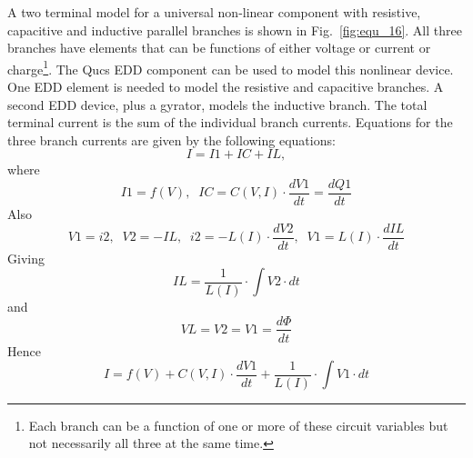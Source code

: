 
A two terminal model for a universal non-linear component with
resistive, capacitive and inductive parallel branches is shown in
Fig.~\ref{fig:equ_16}. All three branches have elements that can be
functions of either voltage or current or charge\footnote{Each branch
can be a function of one or more of these circuit variables but not
necessarily all three at the same time.}.  The Qucs EDD component can
be used to model this nonlinear device. One EDD element is needed to
model the resistive and capacitive branches. A second EDD device, plus
a gyrator, models the inductive branch.  The total terminal current is
the sum of the individual branch currents. Equations for the three
branch currents are given by the following equations:
\begin{equation}
 I=I1+IC+IL,
\end{equation}
where
\begin{equation}
I1 =f(V),\;\; IC=C(V,I)\cdot \dfrac{dV1}{dt} = \dfrac{dQ1}{dt} 
\end{equation} 
Also
\begin{equation}
  V1=i2,\;\;  V2= -IL,\;\;  i2=-L(I) \cdot \dfrac{dV2}{dt},\;\;   V1 = L(I)\cdot \dfrac{dIL}{dt}
\end{equation} 
Giving
\begin{equation}
 IL = \dfrac{1}{L(I)} \cdot \int V2\cdot dt 
\end{equation} 
and
\begin{equation}
 VL= V2 = V1 = \dfrac{d\Phi}{dt}
\end{equation} 
Hence
\begin{equation}
 I=f(V)+C(V,I)\cdot \dfrac{dV1}{dt}+\dfrac{1}{L(I)} \cdot \int V1\cdot dt
\end{equation} 

